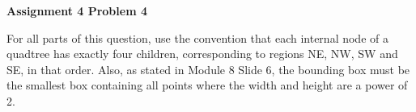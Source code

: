 \documentclass[12pt]{article}
\begin{document}
	
	\begin{center}
		
		{\Large\bf Assignment 4 Problem 4}\\
		\vspace{3mm}
	\end{center}
	
	\def\question#1{\item[\bf #1.]}
	\def\part#1{\item[\bf #1)]}
	\newcommand{\pc}[1]{\mbox{\textbf{#1}}} %
	
	
	
	For all parts of this question, use the convention that each internal node of a quadtree has exactly four children, corresponding to regions NE, NW, SW and SE, in that order.  Also, as stated in Module 8 Slide 6, the bounding box must be the smallest box containing all points where the width and height are a power of 2.
	
\end{document}
